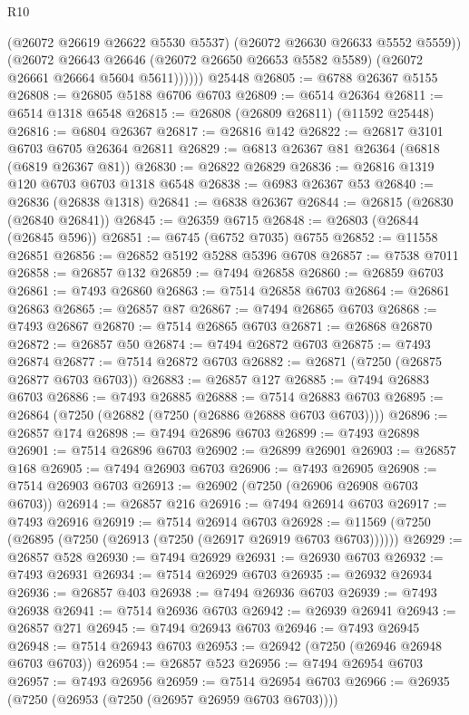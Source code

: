 \begin{lexlean}{R10}
\begin{coremodule}
{{{{{{{{{{{{{{{{{{{{{{{{{{{{{{{{{{{{{{{{{{{{{{{{{{{{{{{{{{{{{{{{{{{{{{{{{{{{{{{{{{{{              (@26072 @26619 @26622 @5530 @5537)
              (@26072 @26630 @26633 @5552 @5559))
            (@26072
              @26643
              @26646
              (@26072 @26650 @26653 @5582 @5589)
              (@26072 @26661 @26664 @5604 @5611))))))
    @25448
@26805 := @6788 @26367 @5155
@26808 := @26805 @5188 @6706 @6703
@26809 := @6514 @26364
@26811 := @6514 @1318 @6548
@26815 := @26808 (@26809 @26811) (@11592 @25448)
@26816 := @6804 @26367
@26817 := @26816 @142
@26822 := @26817 @3101 @6703 @6705 @26364 @26811
@26829 := @6813 @26367 @81 @26364 (@6818 (@6819 @26367 @81))
@26830 := @26822 @26829
@26836 := @26816 @1319 @120 @6703 @6703 @1318 @6548
@26838 := @6983 @26367 @53
@26840 := @26836 (@26838 @1318)
@26841 := @6838 @26367
@26844 := @26815 (@26830 (@26840 @26841))
@26845 := @26359 @6715
@26848 := @26803 (@26844 (@26845 @596))
@26851 := @6745 (@6752 @7035) @6755
@26852 := @11558 @26851
@26856 := @26852 @5192 @5288 @5396 @6708
@26857 := @7538 @7011
@26858 := @26857 @132
@26859 := @7494 @26858
@26860 := @26859 @6703
@26861 := @7493 @26860
@26863 := @7514 @26858 @6703
@26864 := @26861 @26863
@26865 := @26857 @87
@26867 := @7494 @26865 @6703
@26868 := @7493 @26867
@26870 := @7514 @26865 @6703
@26871 := @26868 @26870
@26872 := @26857 @50
@26874 := @7494 @26872 @6703
@26875 := @7493 @26874
@26877 := @7514 @26872 @6703
@26882 := @26871 (@7250 (@26875 @26877 @6703 @6703))
@26883 := @26857 @127
@26885 := @7494 @26883 @6703
@26886 := @7493 @26885
@26888 := @7514 @26883 @6703
@26895 := @26864 (@7250 (@26882 (@7250 (@26886 @26888 @6703 @6703))))
@26896 := @26857 @174
@26898 := @7494 @26896 @6703
@26899 := @7493 @26898
@26901 := @7514 @26896 @6703
@26902 := @26899 @26901
@26903 := @26857 @168
@26905 := @7494 @26903 @6703
@26906 := @7493 @26905
@26908 := @7514 @26903 @6703
@26913 := @26902 (@7250 (@26906 @26908 @6703 @6703))
@26914 := @26857 @216
@26916 := @7494 @26914 @6703
@26917 := @7493 @26916
@26919 := @7514 @26914 @6703
@26928 := @11569 (@7250 (@26895 (@7250 (@26913 (@7250 (@26917 @26919 @6703 @6703))))))
@26929 := @26857 @528
@26930 := @7494 @26929
@26931 := @26930 @6703
@26932 := @7493 @26931
@26934 := @7514 @26929 @6703
@26935 := @26932 @26934
@26936 := @26857 @403
@26938 := @7494 @26936 @6703
@26939 := @7493 @26938
@26941 := @7514 @26936 @6703
@26942 := @26939 @26941
@26943 := @26857 @271
@26945 := @7494 @26943 @6703
@26946 := @7493 @26945
@26948 := @7514 @26943 @6703
@26953 := @26942 (@7250 (@26946 @26948 @6703 @6703))
@26954 := @26857 @523
@26956 := @7494 @26954 @6703
@26957 := @7493 @26956
@26959 := @7514 @26954 @6703
@26966 := @26935 (@7250 (@26953 (@7250 (@26957 @26959 @6703 @6703))))
}}}}}}}}}}}}}}}}}}}}}}}}}}}}}}}}}}}}}}}}}}}}}}}}}}}}}}}}}}}}}}}}}}}}}}}}}}}}}}}}}}}}
\end{coremodule}
\end{lexlean}
